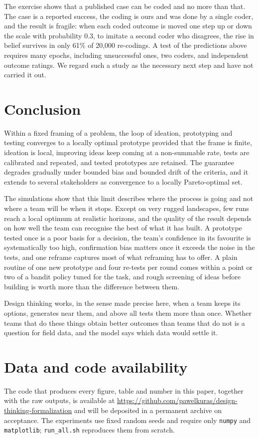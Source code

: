 \documentclass[10pt,twocolumn]{article}
\theoremstyle{definition}
\begin{document}
The exercise shows that a published case can be coded and no more than that. The case is a reported success, the coding is ours and was done by a single coder, and the result is fragile: when each coded outcome is moved one step up or down the scale with probability $0.3$, to imitate a second coder who disagrees, the rise in belief survives in only 61\% of 20{,}000 re-codings. A test of the predictions above requires many epochs, including unsuccessful ones, two coders, and independent outcome ratings. We regard such a study as the necessary next step and have not carried it out.

\section{Conclusion}

Within a fixed framing of a problem, the loop of ideation, prototyping and testing converges to a locally optimal prototype provided that the frame is finite, ideation is local, improving ideas keep coming at a non-summable rate, tests are calibrated and repeated, and tested prototypes are retained. The guarantee degrades gradually under bounded bias and bounded drift of the criteria, and it extends to several stakeholders as convergence to a locally Pareto-optimal set.

The simulations show that this limit describes where the process is going and not where a team will be when it stops. Except on very rugged landscapes, few runs reach a local optimum at realistic horizons, and the quality of the result depends on how well the team can recognise the best of what it has built. A prototype tested once is a poor basis for a decision, the team's confidence in its favourite is systematically too high, confirmation bias matters once it exceeds the noise in the tests, and one reframe captures most of what reframing has to offer. A plain routine of one new prototype and four re-tests per round comes within a point or two of a bandit policy tuned for the task, and rough screening of ideas before building is worth more than the difference between them.

Design thinking works, in the sense made precise here, when a team keeps its options, generates near them, and above all tests them more than once. Whether teams that do these things obtain better outcomes than teams that do not is a question for field data, and the model says which data would settle it.

\section*{Data and code availability}
The code that produces every figure, table and number in this paper, together with the raw outputs, is available at \url{https://github.com/pawelkuras/design-thinking-formalization} and will be deposited in a permanent archive on acceptance. The experiments use fixed random seeds and require only \texttt{numpy} and \texttt{matplotlib}; \texttt{run\_all.sh} reproduces them from scratch.
\end{document}
